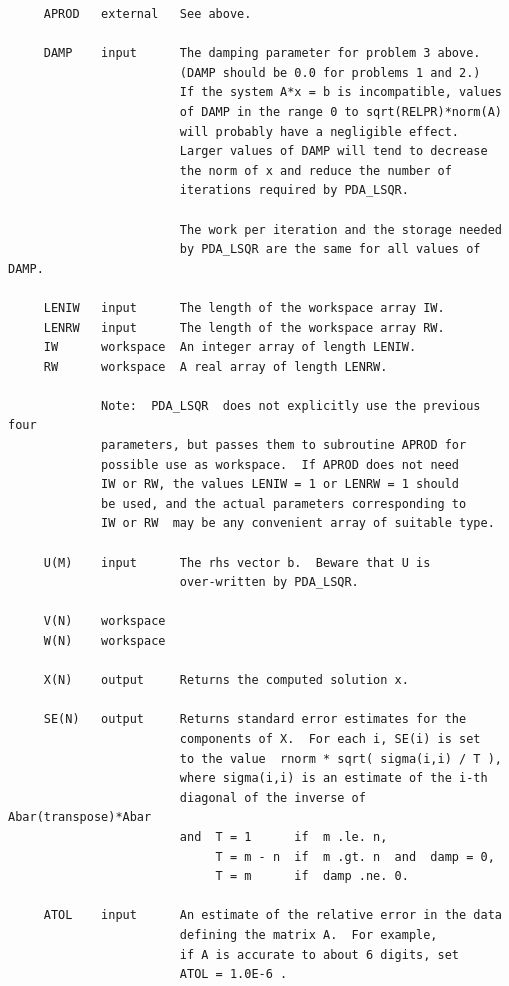 \documentclass[11pt,twoside]{article}
\begin{document}
\begin{verbatim}
     APROD   external   See above.

     DAMP    input      The damping parameter for problem 3 above.
                        (DAMP should be 0.0 for problems 1 and 2.)
                        If the system A*x = b is incompatible, values
                        of DAMP in the range 0 to sqrt(RELPR)*norm(A)
                        will probably have a negligible effect.
                        Larger values of DAMP will tend to decrease
                        the norm of x and reduce the number of
                        iterations required by PDA_LSQR.

                        The work per iteration and the storage needed
                        by PDA_LSQR are the same for all values of DAMP.

     LENIW   input      The length of the workspace array IW.
     LENRW   input      The length of the workspace array RW.
     IW      workspace  An integer array of length LENIW.
     RW      workspace  A real array of length LENRW.

             Note:  PDA_LSQR  does not explicitly use the previous four
             parameters, but passes them to subroutine APROD for
             possible use as workspace.  If APROD does not need
             IW or RW, the values LENIW = 1 or LENRW = 1 should
             be used, and the actual parameters corresponding to
             IW or RW  may be any convenient array of suitable type.

     U(M)    input      The rhs vector b.  Beware that U is
                        over-written by PDA_LSQR.

     V(N)    workspace
     W(N)    workspace

     X(N)    output     Returns the computed solution x.

     SE(N)   output     Returns standard error estimates for the
                        components of X.  For each i, SE(i) is set
                        to the value  rnorm * sqrt( sigma(i,i) / T ),
                        where sigma(i,i) is an estimate of the i-th
                        diagonal of the inverse of Abar(transpose)*Abar
                        and  T = 1      if  m .le. n,
                             T = m - n  if  m .gt. n  and  damp = 0,
                             T = m      if  damp .ne. 0.

     ATOL    input      An estimate of the relative error in the data
                        defining the matrix A.  For example,
                        if A is accurate to about 6 digits, set
                        ATOL = 1.0E-6 .


\end{verbatim}
\end{document}
